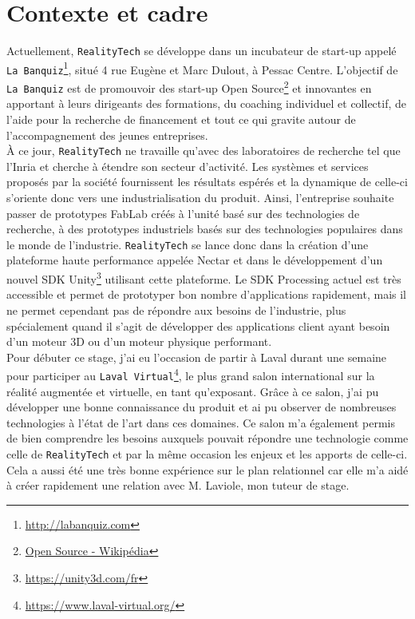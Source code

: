 \section{Contexte et cadre}
\label{sec:contexte}
Actuellement, \texttt{RealityTech} se développe dans un incubateur de start-up appelé \texttt{La Banquiz}\footnote{\href{http://labanquiz.com}{http://labanquiz.com}}, situé 4 rue Eugène et Marc Dulout, à Pessac Centre. L'objectif de \texttt{La Banquiz} est de promouvoir des start-up Open Source\footnote{\href{https://fr.wikipedia.org/wiki/Open\_source}{Open Source - Wikipédia}} et innovantes en apportant à leurs dirigeants des formations, du coaching individuel et collectif, de l'aide pour la recherche de financement et tout ce qui gravite autour de l'accompagnement des jeunes entreprises.\\

À ce jour, \texttt{RealityTech} ne travaille qu'avec des laboratoires de recherche tel que l'Inria et cherche à étendre son secteur d'activité. Les systèmes et services proposés par la société fournissent les résultats espérés et la dynamique de celle-ci s'oriente donc vers une industrialisation du produit. Ainsi, l'entreprise souhaite passer de prototypes FabLab créés à l'unité basé sur des technologies de recherche, à des prototypes industriels basés sur des technologies populaires dans le monde de l'industrie. \texttt{RealityTech} se lance donc dans la création d'une plateforme haute performance appelée Nectar et dans le développement d'un nouvel SDK Unity\footnote{\href{https://unity3d.com/fr}{https://unity3d.com/fr}} utilisant cette plateforme. Le SDK Processing actuel est très accessible et permet de prototyper bon nombre d'applications rapidement, mais il ne permet cependant pas de répondre aux besoins de l'industrie, plus spécialement quand il s'agit de développer des applications client ayant besoin d'un moteur 3D ou d'un moteur physique performant.\\

Pour débuter ce stage, j'ai eu l'occasion de partir à Laval durant une semaine pour participer au \texttt{Laval Virtual}\footnote{\href{https://www.laval-virtual.org/}{https://www.laval-virtual.org/}}, le plus grand salon international sur la réalité augmentée et virtuelle, en tant qu'exposant. Grâce à ce salon, j'ai pu développer une bonne connaissance du produit et ai pu observer de nombreuses technologies à l'état de l'art dans ces domaines. Ce salon m'a également permis de bien comprendre les besoins auxquels pouvait répondre une technologie comme celle de \texttt{RealityTech} et par la même occasion les enjeux et les apports de celle-ci. Cela a aussi été une très bonne expérience sur le plan relationnel car elle m'a aidé à créer rapidement une relation avec M. Laviole, mon tuteur de stage.

